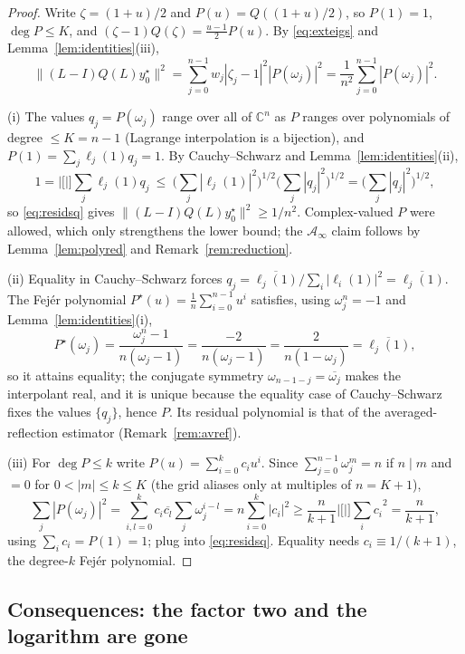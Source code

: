 \documentclass[11pt]{article}
\theoremstyle{definition}
\theoremstyle{remark}
\newcommand{\Aa}{\mathcal{A}}
\newcommand{\C}{\mathbb{C}}
\newcommand{\norm}[1]{\| #1 \|}
\newcommand{\abs}[1]{| #1 |}
\begin{document}
\begin{proof}
Write $\zeta=(1+u)/2$ and $P(u)=Q((1+u)/2)$, so $P(1)=1$, $\deg P\le K$,
and $(\zeta-1)Q(\zeta)=\frac{u-1}2P(u)$. By \eqref{eq:exteigs} and
Lemma~\ref{lem:identities}(iii),
\begin{equation}\label{eq:residsq}
\norm{(L-I)Q(L)y_0^\star}^2
=\sum_{j=0}^{n-1} w_j\abs{\zeta_j-1}^2\abs{P(\omega_j)}^2
=\frac1{n^2}\sum_{j=0}^{n-1}\abs{P(\omega_j)}^2 .
\end{equation}

(i) The values $q_j=P(\omega_j)$ range over all of $\C^n$ as $P$ ranges
over polynomials of degree $\le K=n-1$ (Lagrange interpolation is a
bijection), and $P(1)=\sum_j\ell_j(1)q_j=1$. By Cauchy--Schwarz and
Lemma~\ref{lem:identities}(ii),
\[
1=\abs[\Big]{\sum_j\ell_j(1)q_j}
\ \le\ \Big(\sum_j\abs{\ell_j(1)}^2\Big)^{1/2}
       \Big(\sum_j\abs{q_j}^2\Big)^{1/2}
=\Big(\sum_j\abs{q_j}^2\Big)^{1/2},
\]
so \eqref{eq:residsq} gives $\norm{(L-I)Q(L)y_0^\star}^2\ge1/n^2$.
Complex-valued $P$ were allowed, which only strengthens the lower bound;
the $\Aa_\infty$ claim follows by Lemma~\ref{lem:polyred} and
Remark~\ref{rem:reduction}.

(ii) Equality in Cauchy--Schwarz forces
$q_j=\overline{\ell_j(1)}/\sum_i\abs{\ell_i(1)}^2=\overline{\ell_j(1)}$.
The Fej\'er polynomial $P^\star(u)=\frac1n\sum_{i=0}^{n-1}u^i$ satisfies,
using $\omega_j^n=-1$ and Lemma~\ref{lem:identities}(i),
\[
P^\star(\omega_j)=\frac{\omega_j^n-1}{n(\omega_j-1)}
=\frac{-2}{n(\omega_j-1)}=\frac{2}{n(1-\omega_j)}
=\overline{\ell_j(1)},
\]
so it attains equality; the conjugate symmetry
$\omega_{n-1-j}=\overline{\omega_j}$ makes the interpolant real, and it is
unique because the equality case of Cauchy--Schwarz fixes the values
$\{q_j\}$, hence $P$. Its residual polynomial is that of the
averaged-reflection estimator (Remark~\ref{rem:avref}).

(iii) For $\deg P\le k$ write $P(u)=\sum_{i=0}^k c_iu^i$. Since
$\sum_{j=0}^{n-1}\omega_j^m=n$ if $n\mid m$ and $=0$ for
$0<\abs m\le k\le K$ (the grid aliases only at multiples of $n=K+1$),
\[
\sum_j\abs{P(\omega_j)}^2
=\sum_{i,l=0}^k c_i\overline{c_l}\sum_j\omega_j^{i-l}
=n\sum_{i=0}^k\abs{c_i}^2
\ge \frac{n}{k+1}\abs[\Big]{\sum_i c_i}^2
=\frac{n}{k+1},
\]
using $\sum_i c_i=P(1)=1$; plug into \eqref{eq:residsq}. Equality needs
$c_i\equiv1/(k+1)$, the degree-$k$ Fej\'er polynomial.
\end{proof}

\subsection{Consequences: the factor two and the logarithm are gone}
\end{document}
